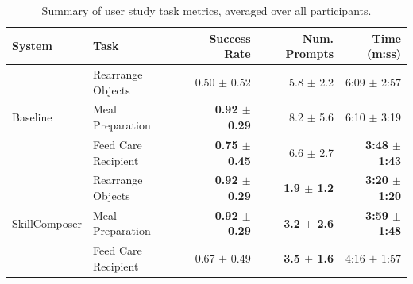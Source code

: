 \begin{table}[t]
\centering
\small
\caption{Summary of user study task metrics, averaged over all participants.}
\label{tab:user_results}
\begin{tabular}{llrrr}
\toprule
System & Task & Success Rate & Num. Prompts & Time (m:ss) \\
\midrule
\multirow{3}{*}{Baseline} & Rearrange Objects & 0.50 $\pm$ 0.52 & 5.8 $\pm$ 2.2 & 6:09 $\pm$ 2:57 \\
 & Meal Preparation & \textbf{0.92 $\pm$ 0.29} & 8.2 $\pm$ 5.6 & 6:10 $\pm$ 3:19 \\
 & Feed Care Recipient & \textbf{0.75 $\pm$ 0.45} & 6.6 $\pm$ 2.7 & \textbf{3:48 $\pm$ 1:43} \\
\midrule
\multirow{3}{*}{SkillComposer} & Rearrange Objects & \textbf{0.92 $\pm$ 0.29} & \textbf{1.9 $\pm$ 1.2} & \textbf{3:20 $\pm$ 1:20} \\
 & Meal Preparation & \textbf{0.92 $\pm$ 0.29} & \textbf{3.2 $\pm$ 2.6} & \textbf{3:59 $\pm$ 1:48} \\
 & Feed Care Recipient & 0.67 $\pm$ 0.49 & \textbf{3.5 $\pm$ 1.6} & 4:16 $\pm$ 1:57 \\
\bottomrule
\end{tabular}
\end{table}
